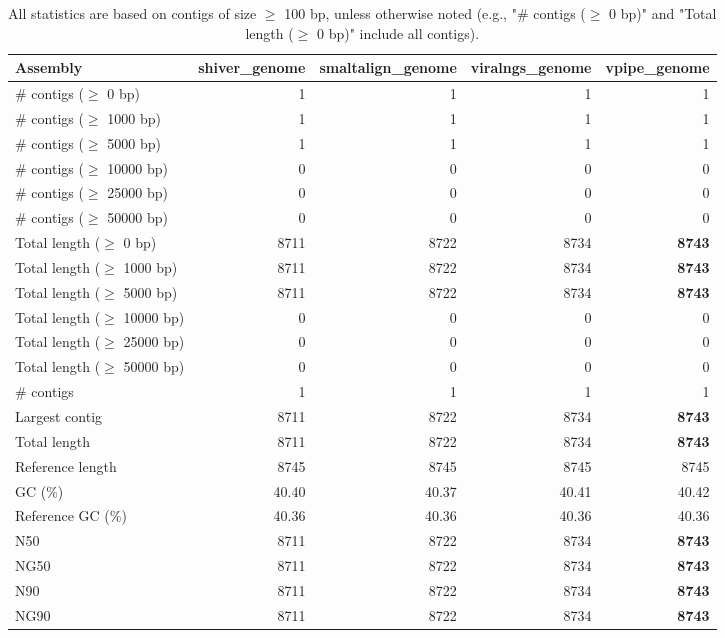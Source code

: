 \documentclass[12pt,a4paper]{article}
\begin{document}
\begin{table}[ht]
\begin{center}
\caption{All statistics are based on contigs of size $\geq$ 100 bp, unless otherwise noted (e.g., "\# contigs ($\geq$ 0 bp)" and "Total length ($\geq$ 0 bp)" include all contigs).}
\begin{tabular}{|l*{4}{|r}|}
\hline
Assembly & shiver\_genome & smaltalign\_genome & viralngs\_genome & vpipe\_genome \\ \hline
\# contigs ($\geq$ 0 bp) & 1 & 1 & 1 & 1 \\ \hline
\# contigs ($\geq$ 1000 bp) & 1 & 1 & 1 & 1 \\ \hline
\# contigs ($\geq$ 5000 bp) & 1 & 1 & 1 & 1 \\ \hline
\# contigs ($\geq$ 10000 bp) & 0 & 0 & 0 & 0 \\ \hline
\# contigs ($\geq$ 25000 bp) & 0 & 0 & 0 & 0 \\ \hline
\# contigs ($\geq$ 50000 bp) & 0 & 0 & 0 & 0 \\ \hline
Total length ($\geq$ 0 bp) & 8711 & 8722 & 8734 & {\bf 8743} \\ \hline
Total length ($\geq$ 1000 bp) & 8711 & 8722 & 8734 & {\bf 8743} \\ \hline
Total length ($\geq$ 5000 bp) & 8711 & 8722 & 8734 & {\bf 8743} \\ \hline
Total length ($\geq$ 10000 bp) & 0 & 0 & 0 & 0 \\ \hline
Total length ($\geq$ 25000 bp) & 0 & 0 & 0 & 0 \\ \hline
Total length ($\geq$ 50000 bp) & 0 & 0 & 0 & 0 \\ \hline
\# contigs & 1 & 1 & 1 & 1 \\ \hline
Largest contig & 8711 & 8722 & 8734 & {\bf 8743} \\ \hline
Total length & 8711 & 8722 & 8734 & {\bf 8743} \\ \hline
Reference length & 8745 & 8745 & 8745 & 8745 \\ \hline
GC (\%) & 40.40 & 40.37 & 40.41 & 40.42 \\ \hline
Reference GC (\%) & 40.36 & 40.36 & 40.36 & 40.36 \\ \hline
N50 & 8711 & 8722 & 8734 & {\bf 8743} \\ \hline
NG50 & 8711 & 8722 & 8734 & {\bf 8743} \\ \hline
N90 & 8711 & 8722 & 8734 & {\bf 8743} \\ \hline
NG90 & 8711 & 8722 & 8734 & {\bf 8743} \\ \hline

\end{tabular}
\end{center}
\end{table}
\end{document}
